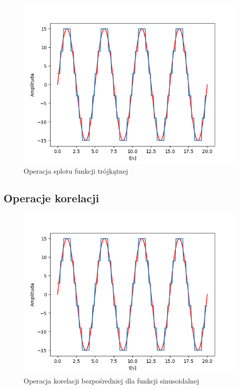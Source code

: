 \documentclass[12pt]{article}
\begin{document}
\begin{figure}[H]
\centering
\includegraphics[scale=0.6]{1sinusKwantStopien5.png}
\caption{Operacja splotu funkcji trójkątnej}
\end{figure}

\subsection{Operacje korelacji}
\begin{figure}[H]
\centering
\includegraphics[scale=0.6]{1sinusKwantStopien5.png}
\caption{Operacja korelacji bezpośredniej dla funkcji sinusoidalnej}
\end{figure}
\end{document}
